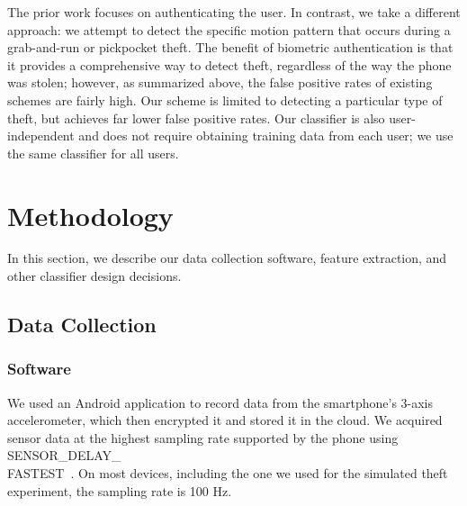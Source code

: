 The prior work focuses on authenticating the user.
In contrast, we take a different approach: we attempt to detect the
specific motion pattern that occurs during a grab-and-run or pickpocket theft.
The benefit of biometric authentication is that it provides a comprehensive
way to detect theft, regardless of the way the phone was stolen; however,
as summarized above, the false positive rates of existing schemes
are fairly high.
Our scheme is limited to detecting a particular type of theft, but achieves
far lower false positive rates.
Our classifier is also user-independent and does not require obtaining
training data from each user; we use the same classifier for all users.




\section{Methodology}

In this section, we describe our data collection software, feature extraction, and other classifier design decisions.

\subsection{Data Collection}

\subsubsection{Software}
We used an Android application to record data from the smartphone's 3-axis accelerometer, which then encrypted it and stored it in the cloud.
We acquired sensor data at the highest sampling rate supported by the phone using SENSOR\_DELAY\_\\FASTEST~\cite{android:doc}. 
On most devices, including the one we used for the simulated theft experiment, the sampling rate is 100 Hz. 

